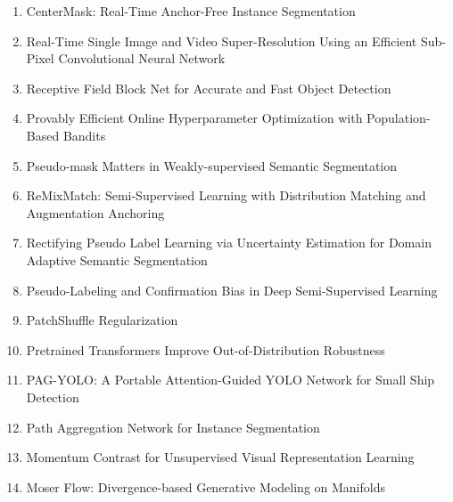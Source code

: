 \documentclass[acmlarge]{acmart}
\begin{document}
\begin{enumerate}
	\item CenterMask: Real-Time Anchor-Free Instance Segmentation \cite{Lee2020CenterMaskRA} 

	\item Real-Time Single Image and Video Super-Resolution Using an Efficient Sub-Pixel Convolutional Neural Network \cite{Shi2016RealTimeSI} 

	\item Receptive Field Block Net for Accurate and Fast Object Detection \cite{Liu2018ReceptiveFB} 

	\item Provably Efficient Online Hyperparameter Optimization with Population-Based Bandits \cite{ParkerHolder2020ProvablyEO} 

	\item Pseudo-mask Matters in Weakly-supervised Semantic Segmentation \cite{Li2021PseudomaskMI} 

	\item ReMixMatch: Semi-Supervised Learning with Distribution Matching and Augmentation Anchoring \cite{Berthelot2020ReMixMatchSL} 

	\item Rectifying Pseudo Label Learning via Uncertainty Estimation for Domain Adaptive Semantic Segmentation \cite{Zheng2021RectifyingPL} 

	\item Pseudo-Labeling and Confirmation Bias in Deep Semi-Supervised Learning \cite{Arazo2020PseudoLabelingAC} 

	\item PatchShuffle Regularization \cite{Kang2017PatchShuffleR} 

	\item Pretrained Transformers Improve Out-of-Distribution Robustness \cite{Hendrycks2020PretrainedTI} 

	\item PAG-YOLO: A Portable Attention-Guided YOLO Network for Small Ship Detection \cite{Hu2021PAGYOLOAP} 

	\item Path Aggregation Network for Instance Segmentation \cite{Liu2018PathAN} 

	\item Momentum Contrast for Unsupervised Visual Representation Learning \cite{He2020MomentumCF} 

	\item Moser Flow: Divergence-based Generative Modeling on Manifolds \cite{Rozen2021MoserFD} 


\end{enumerate}
\end{document}

